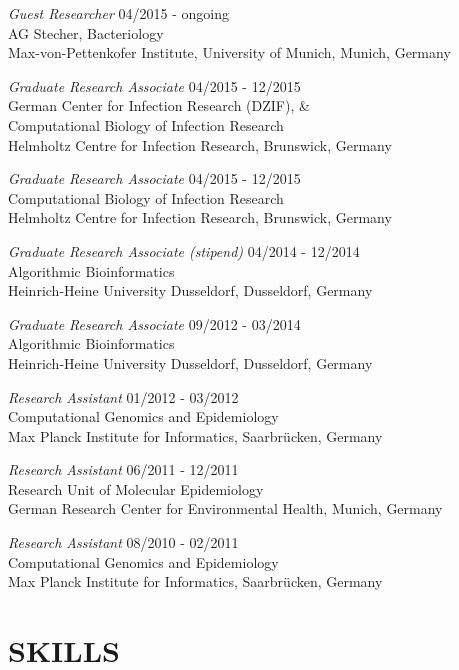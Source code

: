 \documentclass[margin, 10pt]{res}
\begin{document}
\begin{resume}
{\sl Guest Researcher} \hfill 04/2015 - ongoing \\
AG Stecher, Bacteriology\\
Max-von-Pettenkofer Institute, University of Munich, Munich, Germany 

{\sl Graduate Research Associate} \hfill 04/2015 - 12/2015 \\
German Center for Infection Research (DZIF), \&\\
Computational Biology of Infection Research\\
Helmholtz Centre for Infection Research, Brunswick, Germany

{\sl Graduate Research Associate} \hfill 04/2015 - 12/2015 \\
Computational Biology of Infection Research\\
Helmholtz Centre for Infection Research, Brunswick, Germany

{\sl Graduate Research Associate (stipend)} \hfill 04/2014 - 12/2014 \\
Algorithmic Bioinformatics\\
Heinrich-Heine University Dusseldorf, Dusseldorf, Germany

{\sl Graduate Research Associate} \hfill 09/2012 - 03/2014 \\
Algorithmic Bioinformatics\\
Heinrich-Heine University Dusseldorf, Dusseldorf, Germany

{\sl Research Assistant} \hfill 01/2012 - 03/2012 \\
Computational Genomics and Epidemiology\\
Max Planck Institute for Informatics, Saarbr\"ucken, Germany

{\sl Research Assistant} \hfill 06/2011 - 12/2011 \\
Research Unit of Molecular Epidemiology\\
German Research Center for Environmental Health, Munich, Germany

{\sl Research Assistant} \hfill 08/2010 - 02/2011 \\
Computational Genomics and Epidemiology\\
Max Planck Institute for Informatics, Saarbr\"ucken, Germany\\

\section{SKILLS} 


\end{resume}
\end{document}
